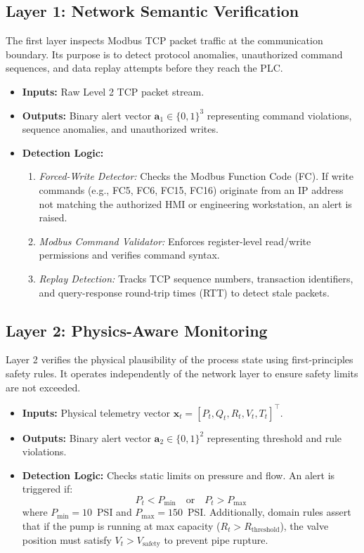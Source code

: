 \documentclass[journal,twoside,web]{ieeecolor}
\begin{document}
\subsection{Layer 1: Network Semantic Verification}
The first layer inspects Modbus TCP packet traffic at the communication boundary. Its purpose is to detect protocol anomalies, unauthorized command sequences, and data replay attempts before they reach the PLC.
\begin{itemize}
    \item \textbf{Inputs:} Raw Level 2 TCP packet stream.
    \item \textbf{Outputs:} Binary alert vector $\bm{a}_1 \in \{0,1\}^3$ representing command violations, sequence anomalies, and unauthorized writes.
    \item \textbf{Detection Logic:} 
    \begin{enumerate}
        \item \emph{Forced-Write Detector:} Checks the Modbus Function Code (FC). If write commands (e.g., FC5, FC6, FC15, FC16) originate from an IP address not matching the authorized HMI or engineering workstation, an alert is raised.
        \item \emph{Modbus Command Validator:} Enforces register-level read/write permissions and verifies command syntax.
        \item \emph{Replay Detection:} Tracks TCP sequence numbers, transaction identifiers, and query-response round-trip times (RTT) to detect stale packets.
    \end{enumerate}
\end{itemize}

\subsection{Layer 2: Physics-Aware Monitoring}
Layer 2 verifies the physical plausibility of the process state using first-principles safety rules. It operates independently of the network layer to ensure safety limits are not exceeded.
\begin{itemize}
    \item \textbf{Inputs:} Physical telemetry vector $\bm{x}_t = [P_t, Q_t, R_t, V_t, T_t]^\top$.
    \item \textbf{Outputs:} Binary alert vector $\bm{a}_2 \in \{0,1\}^2$ representing threshold and rule violations.
    \item \textbf{Detection Logic:} Checks static limits on pressure and flow. An alert is triggered if:
    \begin{equation}
    P_t < P_{\text{min}} \quad \text{or} \quad P_t > P_{\text{max}}
    \end{equation}
    where $P_{\text{min}} = 10$~PSI and $P_{\text{max}} = 150$~PSI. Additionally, domain rules assert that if the pump is running at max capacity ($R_t > R_{\text{threshold}}$), the valve position must satisfy $V_t > V_{\text{safety}}$ to prevent pipe rupture.
\end{itemize}
\end{document}
